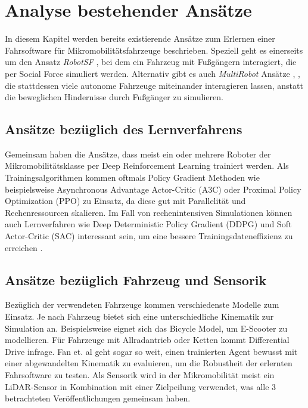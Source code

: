 
\cleardoublepage
\chapter{Analyse bestehender Ansätze}\label{ch:Research}

In diesem Kapitel werden bereits existierende Ansätze zum Erlernen einer Fahrsoftware
für Mikromobilitätsfahrzeuge beschrieben. Speziell geht es einerseits um den Ansatz
\emph{RobotSF} \cite{machines11020268}, bei dem ein Fahrzeug mit Fußgängern interagiert,
die per Social Force simuliert werden. Alternativ gibt es auch \emph{MultiRobot} Ansätze
\cite{fan2020distributed}, \cite{Shunyi2020multirobot2}, die stattdessen viele
autonome Fahrzeuge miteinander interagieren lassen, anstatt die beweglichen Hindernisse
durch Fußgänger zu simulieren.

\section{Ansätze bezüglich des Lernverfahrens}
Gemeinsam haben die Ansätze, dass meist ein oder mehrere Roboter der Mikromobilitätsklasse
per Deep Reinforcement Learning trainiert werden. Als Trainingsalgorithmen kommen oftmals
Policy Gradient Methoden wie beispielsweise Asynchronous Advantage Actor-Critic (A3C) oder
Proximal Policy Optimization (PPO) zu Einsatz, da diese gut mit Parallelität und
Rechenressourcen skalieren. Im Fall von rechenintensiven Simulationen können auch
Lernverfahren wie Deep Deterministic Policy Gradient (DDPG) und Soft Actor-Critic (SAC)
interessant sein, um eine bessere Trainingsdateneffizienz zu erreichen \cite{Kiran2022survey}.

\section{Ansätze bezüglich Fahrzeug und Sensorik}
Bezüglich der verwendeten Fahrzeuge kommen verschiedenste Modelle zum Einsatz. Je nach Fahrzeug
bietet sich eine unterschiedliche Kinematik zur Simulation an. Beispielsweise eignet sich
das Bicycle Model, um E-Scooter zu modellieren. Für Fahrzeuge mit Allradantrieb oder Ketten
kommt Differential Drive infrage. Fan et. al \cite{fan2020distributed} geht sogar so weit,
einen trainierten Agent bewusst mit einer abgewandelten Kinematik zu evaluieren, um die
Robustheit der erlernten Fahrsoftware zu testen. Als Sensorik wird in der Mikromobilität
meist ein LiDAR-Sensor in Kombination mit einer Zielpeilung verwendet, was alle 3 betrachteten
Veröffentlichungen gemeinsam haben.


